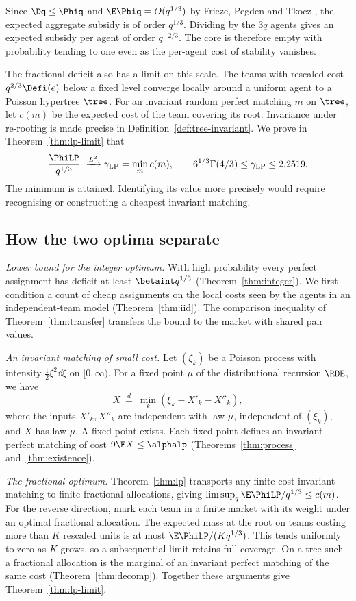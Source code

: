 Since $\Dq\le\Phiq$ and $\E\Phiq=O(q^{1/3})$ by Frieze, Pegden and Tkocz
\cite{FPT20}, the expected aggregate subsidy is of order $q^{1/3}$. Dividing by the
$3q$ agents gives an expected subsidy per agent of order $q^{-2/3}$. The core is
therefore empty with probability tending to one even as the per-agent cost of
stability vanishes.

The fractional deficit also has a limit on this scale. The teams with rescaled cost
$q^{2/3}\Defi(e)$ below a fixed level converge locally around a uniform agent to
a Poisson hypertree $\tree$. For an invariant random perfect matching $m$ on $\tree$,
let $c(m)$ be the expected cost of the team covering its root. Invariance under
re-rooting is made precise in Definition~\ref{def:tree-invariant}. We prove in
Theorem~\ref{thm:lp-limit} that
\[
  \frac{\PhiLP}{q^{1/3}}\ \xrightarrow{L^2}
  \gamma_{\mathrm{LP}}=\min_m c(m),\qquad
  6^{1/3}\Gamma(4/3)\le\gamma_{\mathrm{LP}}\le2.2519.
\]
The minimum is attained. Identifying its value more precisely would require recognising
or constructing a cheapest invariant matching.

\subsection{How the two optima separate}\label{sec:intro-ingredients}

\emph{Lower bound for the integer optimum.}
With high probability every perfect assignment has deficit at least $\betaint q^{1/3}$
(Theorem~\ref{thm:integer}). We first condition a count of cheap assignments on the
local costs seen by the agents in an independent-team model (Theorem~\ref{thm:iid}).
The comparison inequality of Theorem~\ref{thm:transfer} transfers the bound to the
market with shared pair values.

\emph{An invariant matching of small cost.}
Let $(\xi_k)$ be a Poisson process with intensity $\tfrac12\xi^2\dd\xi$ on $[0,\infty)$.
For a fixed point $\mu$ of the distributional recursion $\RDE$, we have
\begin{equation}\label{eq:intro-rde}
 X\ \overset{d}{=}\ \min_k(\xi_k-X'_k-X''_k),
\end{equation}
where the inputs $X'_k,X''_k$ are independent with law $\mu$, independent of
$(\xi_k)$, and $X$ has law $\mu$. A fixed point exists. Each fixed point defines
an invariant perfect matching of cost $9\E X\le\alphalp$
(Theorems~\ref{thm:process} and~\ref{thm:existence}).

\emph{The fractional optimum.} Theorem~\ref{thm:lp} transports any finite-cost invariant
matching to finite fractional allocations, giving $\limsup_q\E\PhiLP/q^{1/3}\le c(m)$.
For the reverse direction, mark each team in a finite market with its weight under an
optimal fractional allocation. The expected mass at the root on teams costing more
than $K$ rescaled units is at most $\E\PhiLP/(Kq^{1/3})$. This tends uniformly to zero
as $K$ grows, so a subsequential limit retains full coverage. On a tree such a
fractional allocation is the marginal of an invariant perfect matching of the same
cost (Theorem~\ref{thm:decomp}). Together these arguments give Theorem~\ref{thm:lp-limit}.

